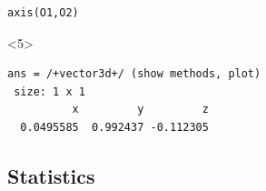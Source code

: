 \documentclass[compress]{beamer}
\begin{document}
\begin{frame}[fragile]
\begin{overlayarea}{\textwidth}{8cm}
\pause

\begin{lstlisting}[style=input]
axis(O1,O2)
\end{lstlisting}

  \begin{onlyenv}<5>
\vspace{-.3cm}
\begin{lstlisting}[style=output]
ans = /+vector3d+/ (show methods, plot)
 size: 1 x 1
          x         y         z
  0.0495585  0.992437 -0.112305
\end{lstlisting}
\end{onlyenv}

  \end{overlayarea}

\end{frame}


\subsection*{Statistics}
\end{document}
